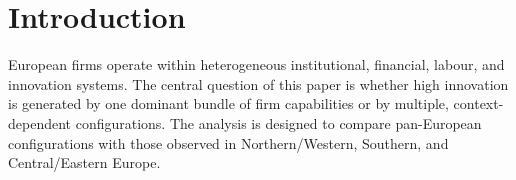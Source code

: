 \section{Introduction}

European firms operate within heterogeneous institutional, financial, labour,
and innovation systems. The central question of this paper is whether high
innovation is generated by one dominant bundle of firm capabilities or by
multiple, context-dependent configurations. The analysis is designed to compare
pan-European configurations with those observed in Northern/Western, Southern,
and Central/Eastern Europe.
